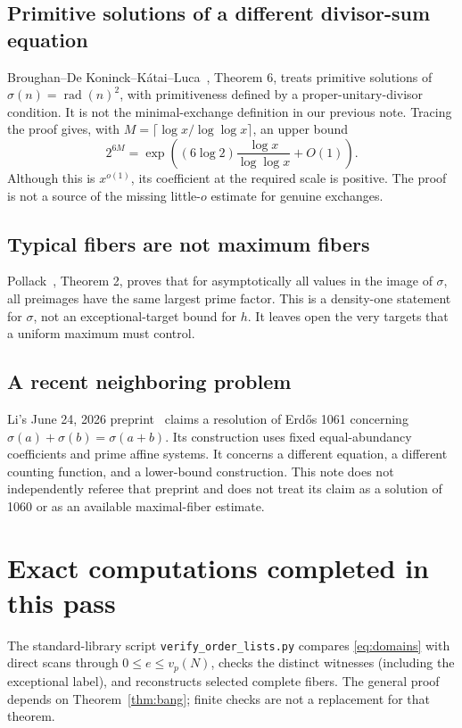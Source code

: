 \documentclass[11pt]{article}
\DeclareMathOperator{\rad}{rad}
\begin{document}
\subsection*{Primitive solutions of a different divisor-sum equation}
Broughan--De Koninck--K\'atai--Luca~\cite{bdkl}, Theorem 6, treats primitive solutions of $\sigma(n)=\rad(n)^2$, with primitiveness defined by a proper-unitary-divisor condition. It is not the minimal-exchange definition in our previous note. Tracing the proof gives, with $M=\lceil\log x/\log\log x\rceil$, an upper bound
\[
 2^{6M}=\exp\!\left((6\log2)\frac{\log x}{\log\log x}+O(1)\right).
\]
Although this is $x^{o(1)}$, its coefficient at the required scale is positive. The proof is not a source of the missing little-$o$ estimate for genuine exchanges.

\subsection*{Typical fibers are not maximum fibers}
Pollack~\cite{pollack2015}, Theorem 2, proves that for asymptotically all values in the image of $\sigma$, all preimages have the same largest prime factor. This is a density-one statement for $\sigma$, not an exceptional-target bound for $h$. It leaves open the very targets that a uniform maximum must control.

\subsection*{A recent neighboring problem}
Li's June 24, 2026 preprint~\cite{li2026} claims a resolution of Erd\H{o}s 1061 concerning $\sigma(a)+\sigma(b)=\sigma(a+b)$. Its construction uses fixed equal-abundancy coefficients and prime affine systems. It concerns a different equation, a different counting function, and a lower-bound construction. This note does not independently referee that preprint and does not treat its claim as a solution of 1060 or as an available maximal-fiber estimate.

\section{Exact computations completed in this pass}
The standard-library script \texttt{verify\_order\_lists.py} compares \eqref{eq:domains} with direct scans through $0\le e\le v_p(N)$, checks the distinct witnesses (including the exceptional label), and reconstructs selected complete fibers. The general proof depends on Theorem~\ref{thm:bang}; finite checks are not a replacement for that theorem.
\end{document}
